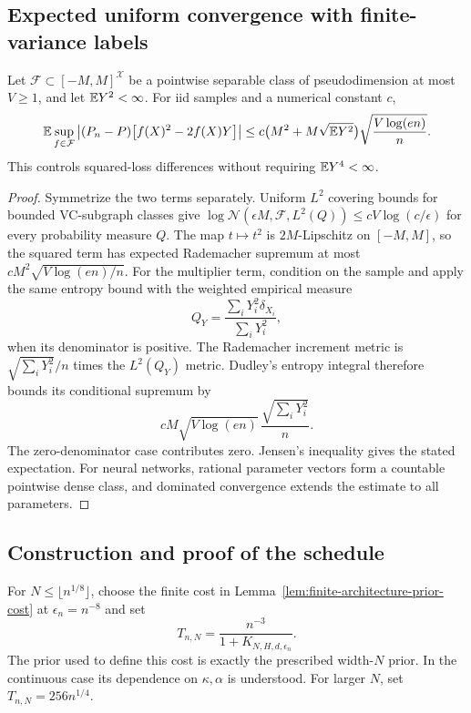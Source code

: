 \subsection{Expected uniform convergence with finite-variance labels}
\begin{lemma}
\label{lem:finite-variance-vc-expectation}
Let $\mathcal F\subset[-M,M]^{\mathcal X}$ be a pointwise separable class
of pseudodimension at most $V\ge1$, and let $\mathbb E Y^2<\infty$.  For iid
samples and a numerical constant $c$,
\[
 \mathbb E\sup_{f\in\mathcal F}
 \left|(P_n-P)\bigl[f(X)^2-2f(X)Y\bigr]\right|
 \le c\bigl(M^2+M\sqrt{\mathbb E Y^2}\bigr)
             \sqrt{\frac{V\log(en)}n}.
\]
This controls squared-loss differences without requiring $\mathbb E Y^4<\infty$.
\end{lemma}
\begin{proof}
Symmetrize the two terms separately.  Uniform $L^2$ covering bounds for
bounded VC-subgraph classes give
$\log\mathcal N(\epsilon M,\mathcal F,L^2(Q))
\le cV\log(c/\epsilon)$ for every probability measure $Q$.
The map $t\mapsto t^2$ is $2M$-Lipschitz on $[-M,M]$, so the squared term
has expected Rademacher supremum at most $cM^2\sqrt{V\log(en)/n}$.
For the multiplier term, condition on the sample and apply the same
entropy bound with the weighted empirical measure
\[
 Q_Y=\frac{\sum_iY_i^2\delta_{X_i}}{\sum_iY_i^2},
\]
when its denominator is positive.  The Rademacher increment metric is
$\sqrt{\sum_iY_i^2}/n$ times the $L^2(Q_Y)$ metric.  Dudley's entropy
integral therefore bounds its conditional supremum by
\[
 cM\sqrt{V\log(en)}\,\frac{\sqrt{\sum_iY_i^2}}n.
\]
The zero-denominator case contributes zero.  Jensen's inequality gives
the stated expectation.
For neural networks, rational parameter vectors form a countable
pointwise dense class, and dominated convergence extends the estimate
to all parameters.
\end{proof}

\subsection{Construction and proof of the schedule}
For $N\le\lfloor n^{1/8}\rfloor$, choose the finite cost in
Lemma~\ref{lem:finite-architecture-prior-cost} at $\epsilon_n=n^{-8}$ and set
\begin{equation}\label{eq:small-width-deterministic-temperature}
 T_{n,N}=\frac{n^{-3}}{1+K_{N,H,d,\epsilon_n}}.
\end{equation}
The prior used to define this cost is exactly the prescribed width-$N$
prior.  In the continuous case its dependence on $\kappa,\alpha$ is
understood.  For larger $N$, set $T_{n,N}=256n^{1/4}$.

